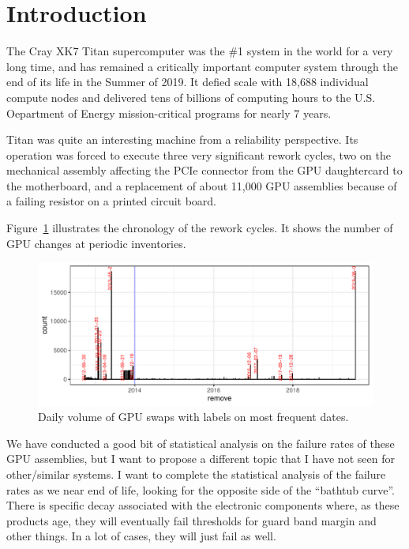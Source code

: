 \section{Introduction}
\label{sec:intro}
The Cray XK7 Titan supercomputer was the \#1 system in the world for a
very long time, and has remained a critically important computer
system through the end of its life in the Summer of 2019. It defied
scale with 18,688 individual compute nodes and delivered tens of
billions of computing hours to the U.S. Oepartment of Energy
mission-critical programs for nearly 7 years.
 
Titan was quite an interesting machine from a reliability perspective.
Its operation was forced to execute three very significant rework cycles, two on
the mechanical assembly affecting the PCIe connector from the GPU
daughtercard to the motherboard, and a replacement of about 11,000 GPU
assemblies because of a failing resistor on a printed circuit board.

Figure~\ref{fig:chronology} illustrates the chronology of the rework
cycles. It shows the number of GPU changes at periodic inventories.
\begin{figure}[tbp]
  \centering
  \includegraphics[width=\textwidth]{figs/chronology001.pdf}
  \caption{Daily volume of GPU swaps with labels on most frequent dates.}
  \label{fig:chronology}
\end{figure}
 
We have conducted a good bit of statistical analysis on the failure
rates of these GPU assemblies, but I want to propose a different topic
that I have not seen for other/similar systems.  I want to complete
the statistical analysis of the failure rates as we near end of life,
looking for the opposite side of the “bathtub curve”.  There is
specific decay associated with the electronic components where, as
these products age, they will eventually fail thresholds for guard
band margin and other things. In a lot of cases, they will just fail
as well. 
 

